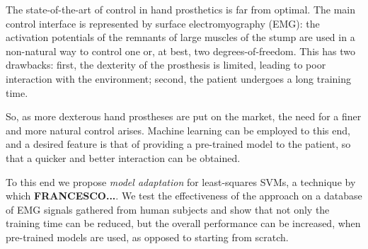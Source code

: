 The state-of-the-art of control in hand prosthetics is far from
optimal. The main control interface is represented by surface
electromyography (EMG): the activation potentials of the remnants of
large muscles of the stump are used in a non-natural way to control
one or, at best, two degrees-of-freedom. This has two drawbacks:
first, the dexterity of the prosthesis is limited, leading to poor
interaction with the environment; second, the patient undergoes a long
training time.

So, as more dexterous hand prostheses are put on the market, the need
for a finer and more natural control arises. Machine learning can be
employed to this end, and a desired feature is that of providing a
pre-trained model to the patient, so that a quicker and better
interaction can be obtained.

To this end we propose \emph{model adaptation} for least-squares SVMs,
a technique by which \textbf{FRANCESCO...}. We test the effectiveness
of the approach on a database of EMG signals gathered from human
subjects and show that not only the training time can be reduced, but
the overall performance can be increased, when pre-trained models are
used, as opposed to starting from scratch.

